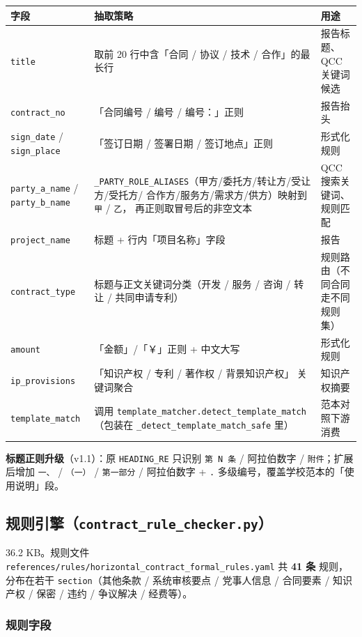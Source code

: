 \documentclass[11pt,a4paper]{article}
\begin{document}
\begin{longtable}{p{3.6cm} p{4.0cm} p{7.2cm}}
\toprule
\textbf{字段} & \textbf{抽取策略} & \textbf{用途} \\ \midrule
\endhead
\texttt{title} & 取前 20 行中含「合同 / 协议 / 技术 / 合作」的最长行 &
报告标题、QCC 关键词候选 \\
\texttt{contract\_no} & 「合同编号 / 编号 / 编号：」正则 & 报告抬头 \\
\texttt{sign\_date} / \texttt{sign\_place} & 「签订日期 / 签署日期 /
签订地点」正则 & 形式化规则 \\
\texttt{party\_a\_name} / \texttt{party\_b\_name} &
\texttt{\_PARTY\_ROLE\_ALIASES}（甲方/委托方/转让方/受让方/受托方/
合作方/服务方/需求方/供方）映射到 \texttt{甲} / \texttt{乙}，
再正则取冒号后的非空文本 & QCC 搜索关键词、规则匹配 \\
\texttt{project\_name} & 标题 + 行内「项目名称」字段 & 报告 \\
\texttt{contract\_type} & 标题与正文关键词分类（开发 / 服务 / 咨询 /
转让 / 共同申请专利） & 规则路由（不同合同走不同规则集） \\
\texttt{amount} & 「金额」/「￥」正则 + 中文大写 & 形式化规则 \\
\texttt{ip\_provisions} & 「知识产权 / 专利 / 著作权 / 背景知识产权」
关键词聚合 & 知识产权摘要 \\
\texttt{template\_match} & 调用 \texttt{template\_matcher.detect\_template\_match}
（包装在 \texttt{\_detect\_template\_match\_safe} 里） & 范本对照下游消费 \\
\bottomrule
\end{longtable}

\textbf{标题正则升级}（v1.1）：原 \texttt{HEADING\_RE} 只识别
\texttt{第 N 条} / 阿拉伯数字 / \texttt{附件}；扩展后增加
\texttt{一、} / \texttt{（一）} / \texttt{第一部分} / 阿拉伯数字 +
\texttt{.} 多级编号，覆盖学校范本的「使用说明」段。

\subsection{规则引擎（\texttt{contract\_rule\_checker.py}）}

36.2 KB。规则文件
\texttt{references/rules/horizontal\_contract\_formal\_rules.yaml}
共 \textbf{41 条} 规则，分布在若干 \texttt{section}（其他条款 / 系统审核要点 /
党事人信息 / 合同要素 / 知识产权 / 保密 / 违约 / 争议解决 / 经费等）。

\subsubsection{规则字段}
\end{document}
